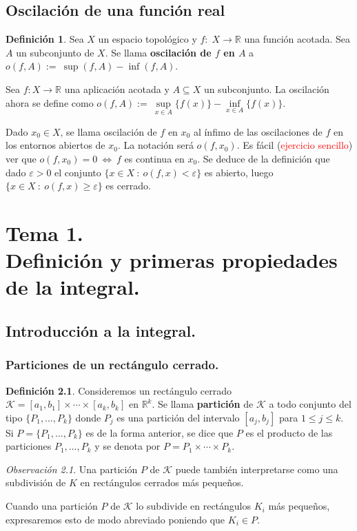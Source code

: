 \documentclass[12pt,twoside]{report}
\newcommand\mc[1]{\mathcal{#1}}
\theoremstyle{azul}
\theoremstyle{azul2}
\theoremstyle{plain}
\theoremstyle{definition}
\newtheorem{defin}{Definición}[chapter]
\theoremstyle{remark}
\newtheorem*{obs}{Observación}
\begin{document}
\section{Oscilación de una función real}
\begin{defin}
Sea $X$ un espacio topológico y $f:\; X \longrightarrow \mathbb{R}$ una función acotada. Sea $A$ un subconjunto de $X$. Se llama \textbf{oscilación de $f$ en $A$} a $o(f,A):= \: \sup(f,A)-\inf(f,A)$.

Sea $f: X \longrightarrow \mathbb{R}$ una aplicación acotada y $A \subseteq X$ un subconjunto. La oscilación ahora se define como $o(f,A) := \: \underset{x \in A}{\sup}\{f(x)\} - \underset{x \in A}{\inf}\{f(x)\}$. 

Dado $x_0 \in X$, se llama oscilación de $f$ en $x_0$ al ínfimo de las oscilaciones de $f$ en los entornos abiertos de $x_0$. La notación  será $o(f,x_0)$. Es fácil (\textcolor{red}{ejercicio sencillo}) ver que $o(f,x_0)=0 \: \Leftrightarrow \: f$ es continua en $x_0$. Se deduce de la definición que dado $\varepsilon > 0$ el conjunto $\{x \in X \: : \: o(f,x) < \varepsilon \}$ es abierto, luego $\{ x \in X \: : \: o(f,x) \geq \varepsilon\}$ es cerrado.
\end{defin}

\chapter{\textbf{Tema 1. \\ Definición y primeras propiedades de la integral.}}
\section{Introducción a la integral.}
\subsection{Particiones de un rectángulo cerrado.}
\begin{defin}
Consideremos un rectángulo cerrado $\mc{K}=[a_1,b_1] \times \cdots \times [a_k,b_k]$ en $\mathbb{R}^k$. Se llama \textbf{partición} de $\mc{K}$ a todo conjunto del tipo $\{P_1, \ldots, P_k\}$ donde $P_j$ es una partición del intervalo $[a_j, b_j]$ para $1 \leq j \leq k$.
Si $P=\{P_1, \ldots, P_k\}$ es de la forma anterior, se dice que $P$ es el producto de las particiones $P_1, \ldots, P_k$ y se denota por $P=P_1 \times \cdots \times P_k$.
\end{defin}
\begin{obs}
Una partición $P$ de $\mc{K}$ puede también interpretarse como una subdivisión de $K$ en rectángulos cerrados más pequeños.

Cuando una partición $P$ de $\mc{K}$ lo subdivide en rectángulos $K_i$ más pequeños, expresaremos esto de modo abreviado poniendo que $K_i \in P$.
\end{obs}
\end{document}
